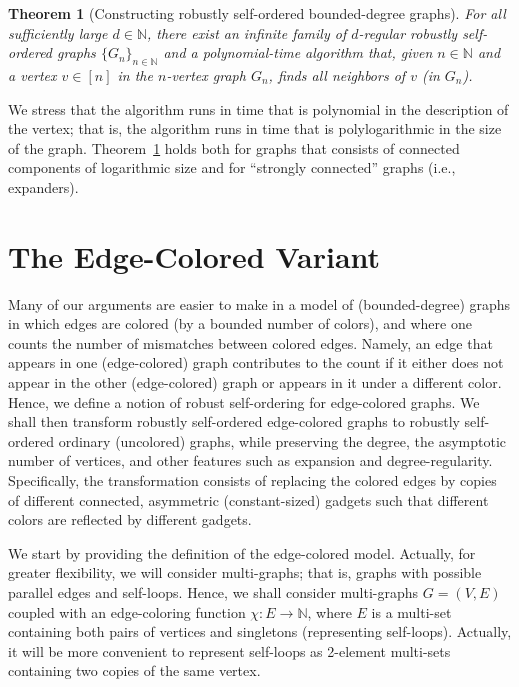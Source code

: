 \documentclass[10pt,a4paper]{article}
\newtheorem{theorem}{Theorem}[section]
\theoremstyle{definition}
\newcommand{\N}{\mathbb N}
\newcommand{\BT}{\begin{theorem}}   \newcommand{\ET}{\end{theorem}}
\begin{document}
\setcounter{theorem}{2}\BT[Constructing robustly self-ordered bounded-degree graphs]
\label{main:ithm}
For all sufficiently large $d\in\N$,
there exist an infinite family of $d$-regular
robustly self-ordered graphs $\{G_n\}_{n\in\N}$
and a polynomial-time algorithm that,
given $n\in\N$ and a vertex $v\in[n]$ in the $n$-vertex graph $G_n$,
finds all neighbors of $v$ {\rm(in $G_n$)}.
%
\ET
We stress that the algorithm runs in time that is polynomial
in the description of the vertex; that is, the algorithm runs
in time that is polylogarithmic in the size of the graph.
Theorem~\ref{main:ithm} holds both for graphs that consists
of connected components of logarithmic size
and for ``strongly connected'' graphs (i.e., expanders).

\section{The Edge-Colored Variant}
\label{edge-colored:sec}
Many of our arguments are easier to make in a model
of (bounded-degree) graphs in which edges are colored
(by a bounded number of colors),
and where one counts the number of mismatches between colored edges.
Namely, an edge that appears in one (edge-colored) graph
contributes to the count if it either does not appear in the
other (edge-colored) graph or appears in it under a different color.
Hence, we define a notion of robust self-ordering for edge-colored graphs.
We shall then transform robustly self-ordered edge-colored graphs
to robustly self-ordered ordinary (uncolored) graphs,
while preserving the degree, the asymptotic number of vertices,
and other features such as expansion and degree-regularity.
Specifically, the transformation consists of replacing the
colored edges by copies of different connected,
asymmetric (constant-sized) gadgets such that different colors
are reflected by different gadgets.

We start by providing the definition of the edge-colored model.
Actually, for greater flexibility, we will consider multi-graphs;
that is, graphs with possible parallel edges and self-loops.
Hence, we shall consider multi-graphs $G=(V,E)$
coupled with an edge-coloring function $\chi\!:\!E\!\to\!\N$,
where $E$ is a multi-set containing both pairs of vertices
and singletons (representing self-loops).
Actually, it will be more convenient to represent self-loops
as 2-element multi-sets containing two copies of the same vertex.
\end{document}

